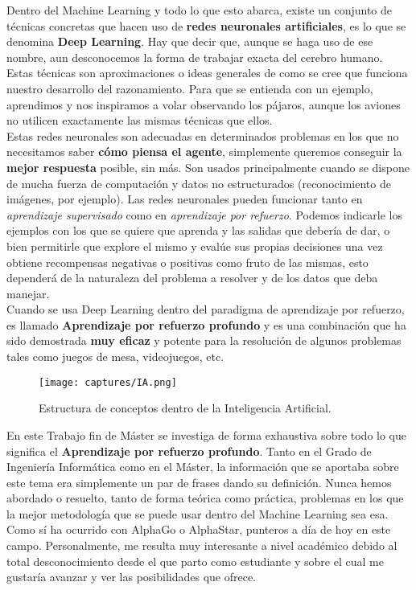 \documentclass[11pt,fleqn]{book} %
\begin{document}
Dentro del Machine Learning y todo lo que esto abarca, existe un conjunto de técnicas concretas que hacen uso de \textbf{redes neuronales artificiales}, es lo que se denomina \textbf{Deep Learning}. Hay que decir que, aunque se haga uso de ese nombre, aun desconocemos la forma de trabajar exacta del cerebro humano. \\

Estas técnicas son aproximaciones o ideas generales de como se cree que funciona nuestro desarrollo del razonamiento. Para que se entienda con un ejemplo, aprendimos y nos inspiramos a volar observando los pájaros, aunque los aviones no utilicen exactamente las mismas técnicas que ellos. \\

Estas redes neuronales son adecuadas en determinados problemas en los que no necesitamos saber \textbf{cómo piensa el agente}, simplemente queremos conseguir la \textbf{mejor respuesta} posible, sin más. Son usados principalmente cuando se dispone de mucha fuerza de computación y datos no estructurados (reconocimiento de imágenes, por ejemplo). Las redes neuronales pueden funcionar tanto en \textit{aprendizaje supervisado} como en \textit{aprendizaje por refuerzo}. Podemos indicarle los ejemplos con los que se quiere que aprenda y las salidas que debería de dar, o bien permitirle que explore el mismo y evalúe sus propias decisiones una vez obtiene recompensas negativas o positivas como fruto de las mismas, esto dependerá de la naturaleza del problema a resolver y de los datos que deba manejar.\cite{article:deeplearning}\\

Cuando se usa Deep Learning dentro del paradigma de aprendizaje por refuerzo, es llamado \textbf{Aprendizaje por refuerzo profundo} y es una combinación que ha sido demostrada \textbf{muy eficaz} y potente para la resolución de algunos problemas tales como juegos de mesa, videojuegos, etc. \\

\begin{figure}[H]
	\centering\texttt{[image: captures/IA.png]}
	\caption{Estructura de conceptos dentro de la Inteligencia Artificial.}
	\label{fig:IA} %
\end{figure}

En este Trabajo fin de Máster se investiga de forma exhaustiva sobre todo lo que significa el \textbf{Aprendizaje por refuerzo profundo}. Tanto en el Grado de Ingeniería Informática como en el Máster, la información que se aportaba sobre este tema era simplemente un par de frases dando su definición. Nunca hemos abordado o resuelto, tanto de forma teórica como práctica, problemas en los que la mejor metodología que se puede usar dentro del Machine Learning sea esa. Como sí ha ocurrido con AlphaGo o AlphaStar, punteros a día de hoy en este campo. Personalmente, me resulta muy interesante a nivel académico debido al total desconocimiento desde el que parto como estudiante y sobre el cual me gustaría avanzar y ver las posibilidades que ofrece.
\end{document}
